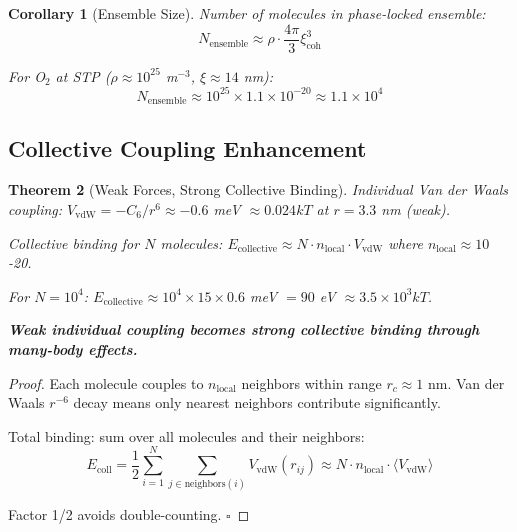 \documentclass[11pt,a4paper]{article}
\newtheorem{theorem}{Theorem}[section]
\newtheorem{corollary}[theorem]{Corollary}
\theoremstyle{definition}
\theoremstyle{remark}
\begin{document}
\begin{corollary}[Ensemble Size]
Number of molecules in phase-locked ensemble:
\begin{equation}
N_{\text{ensemble}} \approx \rho \cdot \frac{4\pi}{3}\xi_{\text{coh}}^3
\end{equation}

For O$_2$ at STP ($\rho \approx 10^{25}$ m$^{-3}$, $\xi \approx 14$ nm):
\begin{equation}
N_{\text{ensemble}} \approx 10^{25} \times 1.1 \times 10^{-20} \approx 1.1 \times 10^4
\end{equation}
\end{corollary}

\subsection{Collective Coupling Enhancement}

\begin{theorem}[Weak Forces, Strong Collective Binding]
Individual Van der Waals coupling: $V_{\text{vdW}} = -C_6/r^6 \approx -0.6$ meV $\approx 0.024 kT$ at $r = 3.3$ nm (weak).

Collective binding for $N$ molecules: $E_{\text{collective}} \approx N \cdot n_{\text{local}} \cdot V_{\text{vdW}}$ where $n_{\text{local}} \approx 10$-20.

For $N = 10^4$: $E_{\text{collective}} \approx 10^4 \times 15 \times 0.6$ meV $= 90$ eV $\approx 3.5 \times 10^3 kT$.

\textbf{Weak individual coupling becomes strong collective binding through many-body effects.}
\end{theorem}

\begin{proof}
Each molecule couples to $n_{\text{local}}$ neighbors within range $r_c \approx 1$ nm. Van der Waals $r^{-6}$ decay means only nearest neighbors contribute significantly.

Total binding: sum over all molecules and their neighbors:
\begin{equation}
E_{\text{coll}} = \frac{1}{2} \sum_{i=1}^N \sum_{j \in \text{neighbors}(i)} V_{\text{vdW}}(r_{ij}) \approx N \cdot n_{\text{local}} \cdot \langle V_{\text{vdW}} \rangle
\end{equation}

Factor 1/2 avoids double-counting. $\square$
\end{proof}
\end{document}
